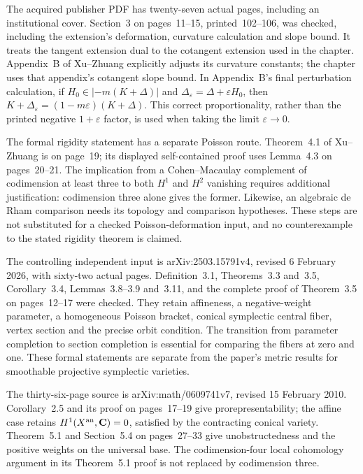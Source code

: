 The acquired publisher PDF
\cite{DruelGuenanciaPaun24Published} has twenty-seven actual
pages, including an institutional cover. Section~3 on
pages~11--15, printed~102--106, was checked, including
the extension's deformation, curvature calculation and
slope bound. It treats the tangent extension dual to
the cotangent extension used in the chapter. Appendix~B
of Xu--Zhuang explicitly adjusts its curvature constants;
the chapter uses that appendix's cotangent slope bound.
In Appendix~B's final perturbation calculation, if
$H_0\in|-m(K+\Delta)|$ and $\Delta_\varepsilon=\Delta+
\varepsilon H_0$, then
$K+\Delta_\varepsilon=(1-m\varepsilon)(K+\Delta)$.
This correct proportionality, rather than the printed
negative $1+\varepsilon$ factor, is used when taking
the limit $\varepsilon\to0$.

The formal rigidity statement has a separate Poisson route.
Theorem~4.1 of Xu--Zhuang is on page~19; its displayed
self-contained proof uses Lemma~4.3 on pages~20--21.
The implication from a Cohen--Macaulay complement of
codimension at least three to both $H^1$ and $H^2$
vanishing requires additional justification:
codimension three alone gives the former.
Likewise, an algebraic de Rham comparison needs its
topology and comparison hypotheses. These steps are not
substituted for a checked Poisson-deformation input, and
no counterexample to the stated rigidity theorem is claimed.

The controlling independent input
\cite{NamikawaOdaka26TorusV4} is arXiv:2503.15791v4,
revised 6 February 2026, with sixty-two actual pages.
Definition~3.1, Theorems~3.3 and~3.5, Corollary~3.4,
Lemmas~3.8--3.9 and~3.11, and the complete proof of
Theorem~3.5 on pages~12--17 were checked. They retain
affineness, a negative-weight parameter, a homogeneous
Poisson bracket, conical symplectic central fiber,
vertex section and the precise orbit condition. The
transition from parameter completion to section
completion is essential for comparing the fibers
at zero and one. These formal statements are separate
from the paper's metric results for smoothable
projective symplectic varieties.

The thirty-six-page source
\cite{Namikawa11AffinePoissonV7} is arXiv:math/0609741v7,
revised 15 February 2010. Corollary~2.5 and its proof
on pages~17--19 give prorepresentability; the affine
case retains $H^1(X^{\rm an},\mathbf C)=0$, satisfied by
the contracting conical variety. Theorem~5.1 and
Section~5.4 on pages~27--33 give unobstructedness and
the positive weights on the universal base. The
codimension-four local cohomology argument in its
Theorem~5.1 proof is not replaced by codimension three.

